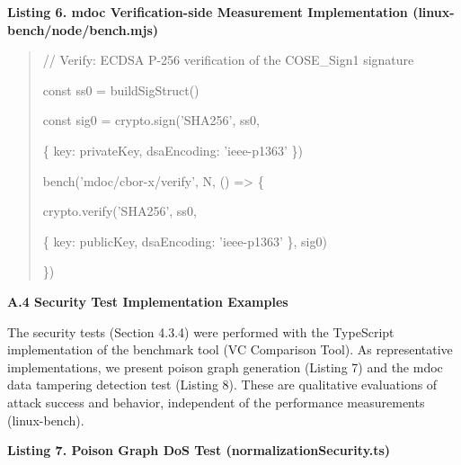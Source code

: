 \textbf{Listing 6. mdoc Verification-side Measurement Implementation (linux-bench/node/bench.mjs)}

\begin{quote}
// Verify: ECDSA P-256 verification of the COSE\_Sign1 signature

const ss0 = buildSigStruct()

const sig0 = crypto.sign('SHA256', ss0,

\{ key: privateKey, dsaEncoding: 'ieee-p1363' \})

bench('mdoc/cbor-x/verify', N, () =\textgreater{} \{

crypto.verify('SHA256', ss0,

\{ key: publicKey, dsaEncoding: 'ieee-p1363' \}, sig0)

\})
\end{quote}

\textbf{A.4 Security Test Implementation Examples}

The security tests (Section 4.3.4) were performed with the TypeScript implementation of the benchmark tool (VC Comparison Tool). As representative implementations, we present poison graph generation (Listing 7) and the mdoc data tampering detection test (Listing 8). These are qualitative evaluations of attack success and behavior, independent of the performance measurements (linux-bench).

\textbf{Listing 7. Poison Graph DoS Test (normalizationSecurity.ts)}

